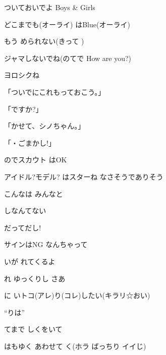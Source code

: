 \documentclass[14pt]{ltjsarticle}
\begin{document}
{  ついておいでよ Boys \& Girls
  \jisho{}

  どこまでも(オーライ) はBlue(オーライ)
  \jisho{}

  もう められない(きって )
  \jisho{}

  ジャマしないでね(のてで How are you?)
  \jisho{}

  ヨロシクね
  \jisho{}

\item
  「ついでにこれもっておこう。」
  \jisho{}

  「ですか?」
  \jisho{}

  「かせて、シノちゃん。」
  \jisho{}

  「・ごまかし!」
  \jisho{}

\item
  のでスカウト はOK
  \jisho{}

  アイドル?モデル? はスターね なさそうでありそう
  \jisho{}

  こんなは みんなと
  \jisho{}

  しなんてない
  \jisho{}

  だってだし!
  \jisho{}

    サインはNG なんちゃって
  \jisho{}

\item
  いが れてくるよ
  \jisho{}

  れ ゆっくりし さあ
  \jisho{}

  に いトコ(アレ)り(コレ)したい(キラリ☆おい)
  \jisho{}

\item
  ``りは''
  \jisho{}

\item
  てまで しくをいて
  \jisho{}

  はもゆく あわせて く(ホラ ばっちり イイじ)
  \jisho{}

}
\end{document}
